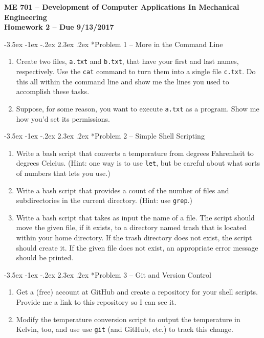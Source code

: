 \documentclass[11pt]{article}
\makeatletter
\renewcommand\section{\@startsection{section}{1}{\z@}%
                                  {-3.5ex \@plus -1ex \@minus -.2ex}%
                                  {2.3ex \@plus.2ex}%
                                  {\normalfont\bfseries}}
\makeatother
\begin{document}
{\large
  \begin{center}
    {\bf ME 701 -- Development of Computer Applications In Mechanical Engineering \\ 
         Homework 2 -- Due 9/13/2017}         
  \end{center}
}
 

\section*{Problem 1 -- More in the Command Line}

\begin{enumerate}
\item Create two files, {\tt a.txt} and {\tt b.txt}, that have your 
      first and last names, respectively.  Use the {\tt cat} command 
      to turn them into a single file {\tt c.txt}.  Do this all within
      the command line and show me the lines you used to accomplish these
      tasks.
\item Suppose, for some reason, you want to execute {\tt a.txt} as a program.
      Show me how you'd set its permissions. 
\end{enumerate} 

\section*{Problem 2 -- Simple Shell Scripting}
 
\begin{enumerate}
\item Write a bash script that converts a temperature from degrees 
      Fahrenheit to degrees Celcius. (Hint: one way is to use {\tt let},
      but be careful about what sorts of numbers that lets you use.)
\item Write a bash script that provides a count of the number of files 
      and subdirectories in the current directory. (Hint: use {\tt grep}.)
\item Write a bash script that takes as input the name of a
      file. The script should move the given file, if it exists, to a 
      directory named trash that is located within 
      your home directory. If the trash directory does not exist, the script 
      should create it. If the given file does not exist, an appropriate 
      error message should be printed. 
\end{enumerate}

\section*{Problem 3 -- Git and Version Control}

\begin{enumerate}
 \item Get a (free) account at GitHub  and create a 
       repository for your shell scripts.  
       Provide me a link to this repository so I can see it.
 \item Modify the temperature conversion script to output the 
       temperature in Kelvin, too, and use 
       use {\tt git} (and GitHub, etc.) to track this change.
\end{enumerate}
 
\end{document}
